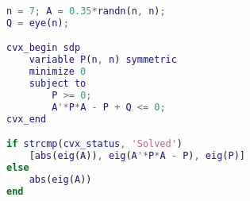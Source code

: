 \begin{lstlisting}[language=Matlab]
n = 7; A = 0.35*randn(n, n);
Q = eye(n);

cvx_begin sdp
    variable P(n, n) symmetric
    minimize 0
    subject to
        P >= 0;
        A'*P*A - P + Q <= 0;
cvx_end

if strcmp(cvx_status, 'Solved')
    [abs(eig(A)), eig(A'*P*A - P), eig(P)]
else
    abs(eig(A))
end
\end{lstlisting}